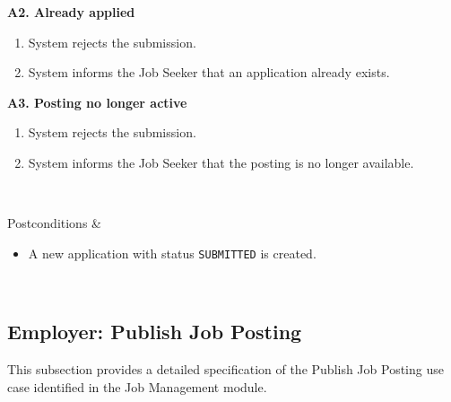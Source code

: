 \begin{usecasespectable}
	\textbf{A2. Already applied}
	\begin{enumerate}
		\item System rejects the submission.
		\item System informs the Job Seeker that an application already exists.
	\end{enumerate}

	\textbf{A3. Posting no longer active}
	\begin{enumerate}
		\item System rejects the submission.
		\item System informs the Job Seeker that the posting is no longer available.
	\end{enumerate}
	\\ \hline

	Postconditions &
	\begin{itemize}
		\item A new application with status \texttt{SUBMITTED} is created.
	\end{itemize}
	\\ \hline

\end{usecasespectable}

\newpage
\subsection{Employer: Publish Job Posting}

This subsection provides a detailed specification of the Publish Job Posting use case identified in the Job Management module.

